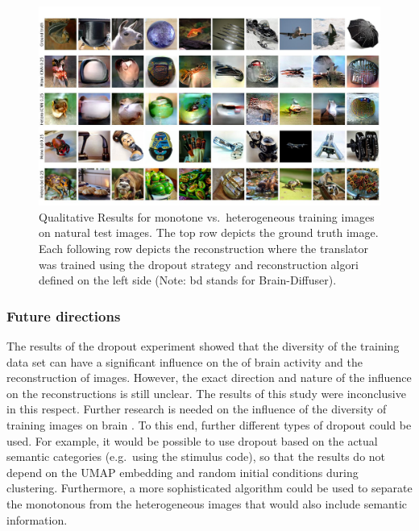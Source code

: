 \begin{figure}[ht]
  \centering
  \includegraphics[width=1\textwidth]{plots/dropout_discussion_test.JPEG}
  \caption[Reconstructed images monotone vs.\ heterogeneous training samples]{Qualitative Results for monotone vs.\ heterogeneous training images on natural test images. The top row depicts the ground truth image. Each following row depicts the reconstruction where the translator was trained using the dropout strategy and reconstruction algori defined on the left side (Note: bd stands for Brain-Diffuser).}\label{fig:dropout_discussion_test}
\end{figure}

\subsubsection{Future directions}

The results of the dropout experiment showed that the diversity of the training data set can have a significant influence on the  of brain activity and the reconstruction of images. However, the exact direction and nature of the influence on the  reconstructions is still unclear. The results of this study were inconclusive in this respect. Further research is needed on the influence of the diversity of training images on brain . To this end, further different types of dropout could be used. For example, it would be possible to use dropout based on the actual semantic categories (e.g.\ using the stimulus code), so that the results do not depend on the UMAP embedding and random initial conditions during clustering. Furthermore, a more sophisticated algorithm could be used to separate the monotonous from the heterogeneous images that would also include semantic information. 

